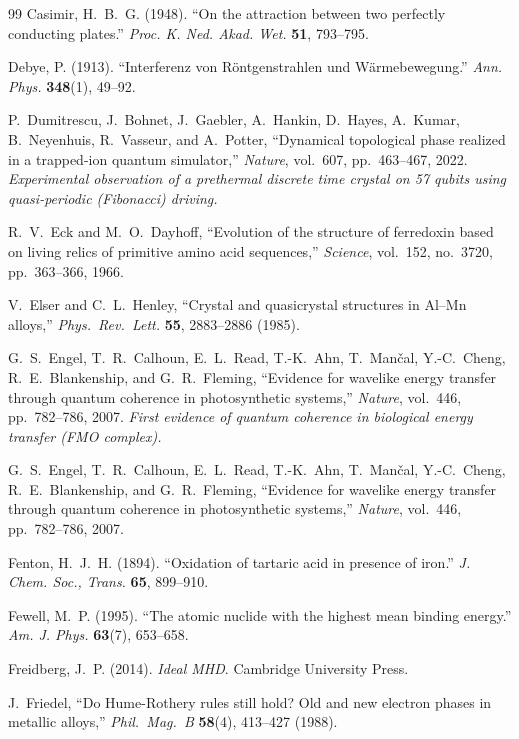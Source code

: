 \documentclass[12pt,oneside]{book}
\begin{document}
\begin{thebibliography}{99}
Casimir, H.~B.~G. (1948).
``On the attraction between two perfectly conducting plates.''
\textit{Proc. K. Ned. Akad. Wet.} \textbf{51}, 793--795.

Debye, P. (1913).
``Interferenz von R\"ontgenstrahlen und W\"armebewegung.''
\textit{Ann. Phys.} \textbf{348}(1), 49--92.

P.~Dumitrescu, J.~Bohnet, J.~Gaebler, A.~Hankin, D.~Hayes, A.~Kumar,
B.~Neyenhuis, R.~Vasseur, and A.~Potter,
``Dynamical topological phase realized in a trapped-ion quantum simulator,''
\emph{Nature}, vol.~607, pp.~463--467, 2022.
\textit{Experimental observation of a prethermal discrete time crystal on 57 qubits
using quasi-periodic (Fibonacci) driving.}

R.~V.~Eck and M.~O.~Dayhoff,
``Evolution of the structure of ferredoxin based on living relics of primitive amino acid sequences,''
\emph{Science}, vol.~152, no.~3720, pp.~363--366, 1966.

V.~Elser and C.~L.~Henley,
``Crystal and quasicrystal structures in Al--Mn alloys,''
\emph{Phys.~Rev.~Lett.} \textbf{55}, 2883--2886 (1985).

G.~S.~Engel, T.~R.~Calhoun, E.~L.~Read, T.-K.~Ahn, T.~Man\v{c}al, Y.-C.~Cheng,
R.~E.~Blankenship, and G.~R.~Fleming,
``Evidence for wavelike energy transfer through quantum coherence in photosynthetic systems,''
\emph{Nature}, vol.~446, pp.~782--786, 2007.
\textit{First evidence of quantum coherence in biological energy transfer (FMO complex).}

G.~S.~Engel, T.~R.~Calhoun, E.~L.~Read, T.-K.~Ahn, T.~Man\v{c}al, Y.-C.~Cheng,
R.~E.~Blankenship, and G.~R.~Fleming,
``Evidence for wavelike energy transfer through quantum coherence in photosynthetic systems,''
\emph{Nature}, vol.~446, pp.~782--786, 2007.

Fenton, H.~J.~H. (1894).
``Oxidation of tartaric acid in presence of iron.''
\textit{J. Chem. Soc., Trans.} \textbf{65}, 899--910.

Fewell, M.~P. (1995).
``The atomic nuclide with the highest mean binding energy.''
\textit{Am. J. Phys.} \textbf{63}(7), 653--658.

Freidberg, J.~P. (2014).
\textit{Ideal MHD}. Cambridge University Press.

J.~Friedel,
``Do Hume-Rothery rules still hold? Old and new electron phases in metallic alloys,''
\emph{Phil.~Mag.~B} \textbf{58}(4), 413--427 (1988).


\end{thebibliography}
\end{document}
